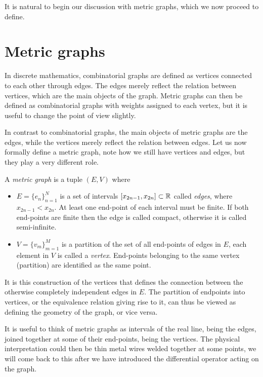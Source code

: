 It is natural to begin our discussion with metric graphs, which we now proceed to define.



\section{Metric graphs}\label{sec: metric graphs}

In discrete mathematics, combinatorial graphs are defined as vertices connected to each other through edges. The edges merely reflect the relation between vertices, which are the main objects of the graph. Metric graphs can then be defined as combinatorial graphs with weights assigned to each vertex, but it is useful to change the point of view slightly.

In contrast to combinatorial graphs, the main objects of metric graphs are the edges, while the vertices merely reflect the relation between edges. Let us now formally define a metric graph, note how we still have vertices and edges, but they play a very different role.

\begin{definition}
  A \emph{metric graph} is a tuple $(E,V)$ where
  \begin{itemize}
    \item $E = \{e_n\}_{n=1}^N$ is a set of intervals $[x_{2n-1}, x_{2n}] \subset \mathbb{R}$ called \emph{edges}, where $x_{2n-1} < x_{2n}$. At least one end-point of each interval must be finite. If both end-points are finite then the edge is called compact, otherwise it is called semi-infinite.
    \item $V = \{v_m\}_{m=1}^M$ is a partition of the set of all end-points of edges in $E$, each element in $V$ is called a \emph{vertex}. End-points belonging to the same vertex (partition) are identified as the same point.
  \end{itemize}
\end{definition}

It is this construction of the vertices that defines the connection between the otherwise completely independent edges in $E$. The partition of endpoints into vertices, or the equivalence relation giving rise to it, can thus be viewed as defining the geometry of the graph, or vice versa.

It is useful to think of metric graphs as intervals of the real line, being the edges, joined together at some of their end-points, being the vertices. The physical interpretation could then be thin metal wires welded together at some points, we will come back to this after we have introduced the differential operator acting on the graph.

